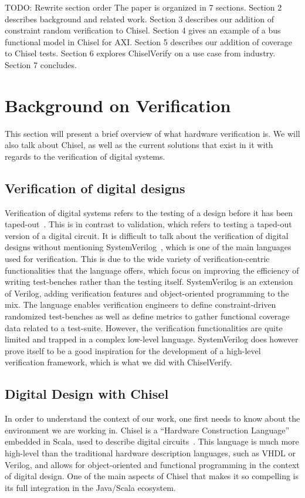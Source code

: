\documentclass[runningheads]{llncs}
\newcommand{\todo}[1]{{\color{olive} TODO: #1}}
\begin{document}
\todo{Rewrite section order}
The paper is organized in 7 sections.
Section 2 describes background and related work.
Section 3 describes our addition of constraint random verification to Chisel.
Section 4 gives an example of a bus functional model in Chisel for AXI.
Section 5 describes our addition of coverage to Chisel tests.
Section 6 explores ChiselVerify on a use case from industry.
Section 7 concludes.


\section{Background on Verification}
\label{sec:background}

This section will present a brief overview of what hardware verification is. We will also talk about Chisel, as well as the current solutions that exist in it with regards to the verification of digital systems.

\subsection{Verification of digital designs}
Verification of digital systems refers to the testing of a design before it has been taped-out~\cite{spear2008systemverilog}. This is in contrast to validation, which refers to testing a taped-out version of a digital circuit. 
It is difficult to talk about the verification of digital designs without mentioning SystemVerilog~\cite{SystemVerilog}, which is one of the main languages used for verification.
This is due to the wide variety of verification-centric functionalities that the language offers, which focus on improving the efficiency of writing test-benches rather than the testing itself.
SystemVerilog is an extension of Verilog, adding verification features and object-oriented programming to the mix. 
The language enables verification engineers to define constraint-driven randomized test-benches as well as define metrics to gather functional coverage data related to a test-suite. 
However, the verification functionalities are quite limited and trapped in a complex low-level language. 
SystemVerilog does however prove itself to be a good inspiration for the development of a high-level verification framework, which is what we did with ChiselVerify.

\subsection{Digital Design with Chisel}
In order to understand the context of our work, one first needs to know about the environment we are working in.
Chisel is a ``Hardware Construction Language'' embedded in Scala, used to describe digital circuits~\cite{chisel:dac2012}.
This language is much more high-level than the traditional hardware description languages, such as VHDL or Verilog, and allows for object-oriented and functional programming in the context of digital design.
One of the main aspects of Chisel that makes it so compelling is its full integration in the Java/Scala ecosystem.
\end{document}
